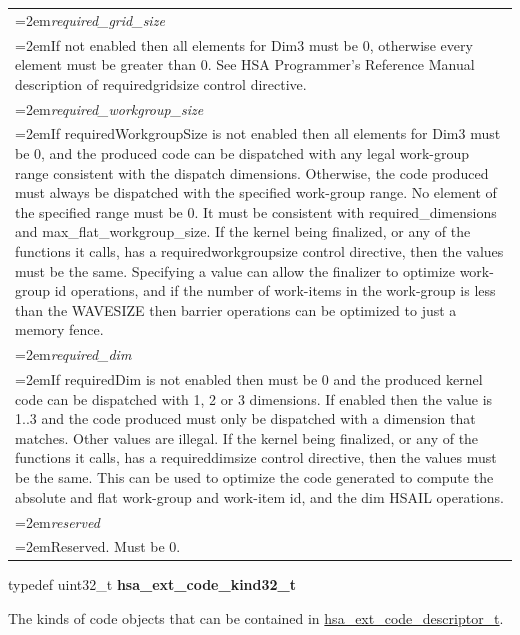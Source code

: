 \documentclass[final]{book}
\newcommand{\reffld}[1]{\textit{#1}}
\begin{document}
\begin{longtable}{@{}>{\hangindent=2em}p{\textwidth}}
\reffld{required_grid_size}\\\hspace{2em}If not enabled then all elements for Dim3 must be 0, otherwise every element must be greater than 0. See HSA Programmer's Reference Manual description of requiredgridsize control directive.\\[2mm]
\reffld{required_workgroup_size}\\\hspace{2em}If requiredWorkgroupSize is not enabled then all elements for Dim3 must be 0, and the produced code can be dispatched with any legal work-group range consistent with the dispatch dimensions. Otherwise, the code produced must always be dispatched with the specified work-group range. No element of the specified range must be 0. It must be consistent with required_dimensions and max_flat_workgroup_size. If the kernel being finalized, or any of the functions it calls, has a requiredworkgroupsize control directive, then the values must be the same. Specifying a value can allow the finalizer to optimize work-group id operations, and if the number of work-items in the work-group is less than the WAVESIZE then barrier operations can be optimized to just a memory fence.\\[2mm]
\reffld{required_dim}\\\hspace{2em}If requiredDim is not enabled then must be 0 and the produced kernel code can be dispatched with 1, 2 or 3 dimensions. If enabled then the value is 1..3 and the code produced must only be dispatched with a dimension that matches. Other values are illegal. If the kernel being finalized, or any of the functions it calls, has a requireddimsize control directive, then the values must be the same. This can be used to optimize the code generated to compute the absolute and flat work-group and work-item id, and the dim HSAIL operations.\\[2mm]
\reffld{reserved}\\\hspace{2em}Reserved. Must be 0.
\end{longtable}



\noindent\begin{tcolorbox}[nobeforeafter,arc=0mm,colframe=white,colback=lightgray,left=0mm]
typedef uint32_t  \hypertarget{group__FinalizerCoreApi_1gaeb2b662521c2d1056eec8dfd45fbb960}{\textbf{hsa_ext_code_kind32_t}}
\end{tcolorbox}
The kinds of code objects that can be contained in \hyperlink{group__FinalizerCoreApi_1ga0e01eabc57d7105ea37e1abbb50fa337}{hsa_ext_code_descriptor_t}.
\\
\end{document}
